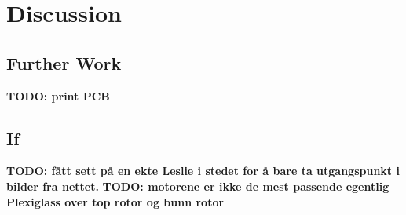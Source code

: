 \chapter{Discussion}
\section{Further Work}
\textbf{TODO: print PCB}


\section{If }
\textbf{TODO: fått sett på en ekte Leslie i stedet for å bare ta utgangspunkt i bilder fra nettet.}
\textbf{TODO: motorene er ikke de mest passende egentlig}
\textbf{Plexiglass over top rotor og bunn rotor}


